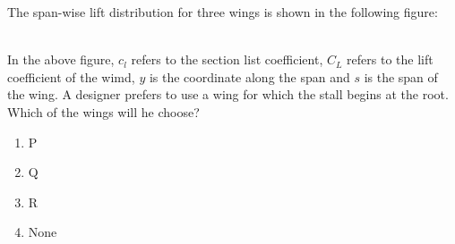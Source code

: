 	\item The span-wise lift distribution for three wings is shown in the following figure:
		\begin{figure}[h!]
			
		\end{figure}\\
		In the above figure, $c_l$ refers to the section list coefficient, $C_L$ refers to the lift coefficient of the wimd, $y$ is the coordinate along the span and $s$ is the span of the wing. A designer prefers to use a wing for which the stall begins at the root. Which of the wings will he choose?
		\begin{enumerate}
			\item P
			\item Q
			\item R
			\item None
		\end{enumerate}
%
